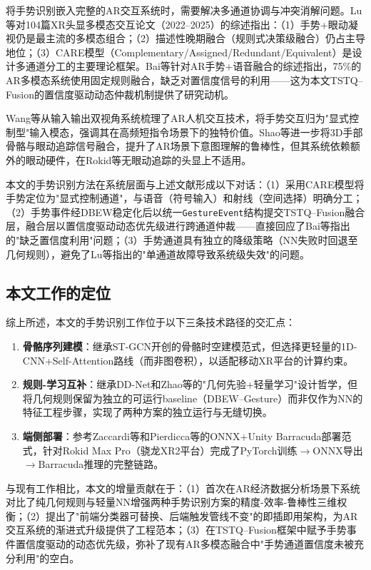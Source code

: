 将手势识别嵌入完整的AR交互系统时，需要解决多通道协调与冲突消解问题。Lu等\cite{lu2025spatial_computing}对104篇XR头显多模态交互论文（2022--2025）的综述指出：（1）手势+眼动凝视仍是最主流的多模态组合；（2）描述性晚期融合（规则式决策级融合）仍占主导地位；（3）CARE模型（Complementary/Assigned/Redundant/Equivalent）是设计多通道分工的主要理论框架。Bai等\cite{bai2025ar_gesture_speech}针对AR手势+语音融合的综述指出，75\%的AR多模态系统使用固定规则融合，缺乏对置信度信号的利用——这为本文TSTQ--Fusion的置信度驱动动态仲裁机制提供了研究动机。

Wang等\cite{wang2026ar_io_survey}从输入输出双视角系统梳理了AR人机交互技术，将手势交互归为"显式控制型"输入模态，强调其在高频短指令场景下的独特价值。Shao等\cite{shao2024cv_gesture}进一步将3D手部骨骼与眼动追踪信号融合，提升了AR场景下意图理解的鲁棒性，但其系统依赖额外的眼动硬件，在Rokid等无眼动追踪的头显上不适用。

本文的手势识别方法在系统层面与上述文献形成以下对话：（1）采用CARE模型将手势定位为"显式控制通道"，与语音（符号输入）和射线（空间选择）明确分工；（2）手势事件经DBEW稳定化后以统一\texttt{GestureEvent}结构提交TSTQ--Fusion融合层，融合层以置信度驱动动态优先级进行跨通道仲裁——直接回应了Bai等\cite{bai2025ar_gesture_speech}指出的"缺乏置信度利用"问题；（3）手势通道具有独立的降级策略（NN失败时回退至几何规则），避免了Lu等\cite{lu2025spatial_computing}指出的"单通道故障导致系统级失效"的问题。

\subsection{本文工作的定位}

综上所述，本文的手势识别工作位于以下三条技术路径的交汇点：

\begin{enumerate}[leftmargin=*]
  \item \textbf{骨骼序列建模}：继承ST-GCN开创的骨骼时空建模范式，但选择更轻量的1D-CNN+Self-Attention路线（而非图卷积），以适配移动XR平台的计算约束。
  \item \textbf{规则-学习互补}：继承DD-Net和Zhao等\cite{zhao2022fast_skeleton_hgr}的"几何先验+轻量学习"设计哲学，但将几何规则保留为独立的可运行baseline（DBEW--Gesture）而非仅作为NN的特征工程步骤，实现了两种方案的独立运行与无缝切换。
  \item \textbf{端侧部署}：参考Zaccardi等\cite{zaccardi2023hololens_barracuda}和Pierdicca等\cite{pierdicca2024deepreality}的ONNX+Unity Barracuda部署范式，针对Rokid Max Pro（骁龙XR2平台）完成了PyTorch训练$\rightarrow$ONNX导出$\rightarrow$Barracuda推理的完整链路。
\end{enumerate}

与现有工作相比，本文的增量贡献在于：（1）首次在AR经济数据分析场景下系统对比了纯几何规则与轻量NN增强两种手势识别方案的精度-效率-鲁棒性三维权衡；（2）提出了"前端分类器可替换、后端触发管线不变"的即插即用架构，为AR交互系统的渐进式升级提供了工程范本；（3）在TSTQ--Fusion框架中赋予手势事件置信度驱动的动态优先级，弥补了现有AR多模态融合中"手势通道置信度未被充分利用"的空白。

